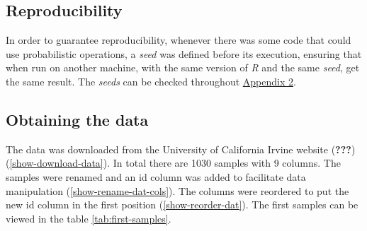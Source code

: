 \documentclass[]{article}
\begin{document}
\hypertarget{reproducibility}{%
\subsection{Reproducibility}\label{reproducibility}}

In order to guarantee reproducibility, whenever there was some code that
could use probabilistic operations, a \emph{seed} was defined before its
execution, ensuring that when run on another machine, with the same
version of \emph{R} and the same \emph{seed}, get the same result. The
\emph{seeds} can be checked throughout
\protect\hyperlink{appendix2}{Appendix 2}.

\hypertarget{obtaining-the-data}{%
\subsection{Obtaining the data}\label{obtaining-the-data}}

The data was downloaded from the University of California Irvine website
({\textbf{???}}) (\ref{show-download-data}). In total there are 1030
samples with 9 columns. The samples were renamed and an id column was
added to facilitate data manipulation (\ref{show-rename-dat-cols}). The
columns were reordered to put the new id column in the first position
(\ref{show-reorder-dat}). The first samples can be viewed in the table
\ref{tab:first-samples}.

~

\begin{table}[H]

\caption{\label{tab:first-samples}First 6 samples}
\centering
{}
\end{table}
\end{document}
